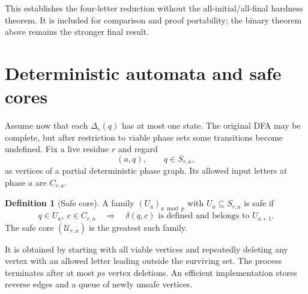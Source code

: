 \documentclass[11pt,letterpaper]{article}
\theoremstyle{definition}
\newtheorem{definition}[theorem]{Definition}
\theoremstyle{remark}
\newcommand{\Core}{\mathcal U}
\begin{document}
This establishes the four-letter reduction without the all-initial/all-final
hardness theorem. It is included for comparison and proof portability; the
binary theorem above remains the stronger final result.

\section{Deterministic automata and safe cores}\label{ccc:ps:sec:dfa}

Assume now that each $\Delta_c(q)$ has at most one state. The original
DFA may be complete, but after restriction to viable phase sets some
transitions become undefined. Fix a live residue $r$ and regard
\[
 (a,q),\qquad q\in S_{r,a},
\]
as vertices of a partial deterministic phase graph. Its allowed input
letters at phase $a$ are $C_{r,a}$.

\begin{definition}[Safe core]\label{ccc:ps:def:safe-core}
A family $(U_a)_{a\bmod p}$ with $U_a\subseteq S_{r,a}$ is safe if
\[
 q\in U_a,
 \ c\in C_{r,a}
 \quad\Longrightarrow\quad
 \delta(q,c)\text{ is defined and belongs to }U_{a+1}.
\]
The safe core $(\Core_{r,a})$ is the greatest such family.
\end{definition}

It is obtained by starting with all viable vertices and repeatedly deleting
any vertex with an allowed letter leading outside the surviving set.
The process terminates after at most $ps$ vertex deletions. An efficient
implementation stores reverse edges and a queue of newly unsafe vertices.
\end{document}
